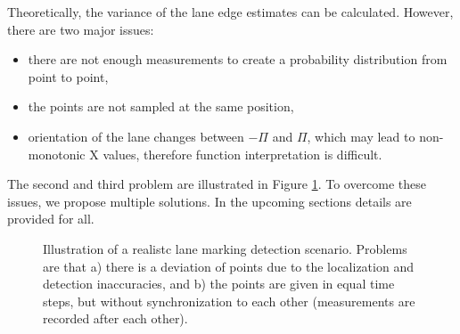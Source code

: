 \documentclass[sn-mathphys-num]{sn-jnl}%
\begin{document}
Theoretically, the variance of the lane edge estimates can be calculated. However, there are two major issues:
\begin{itemize}
    \item there are not enough measurements to create a probability distribution from point to point,
    \item the points are not sampled at the same position,
    \item orientation of the lane changes between $-\Pi$ and $\Pi$, which may lead to non-monotonic X values, therefore function interpretation is difficult.
\end{itemize}
The second and third problem are illustrated in Figure \ref{fig:deviation_problem}. To overcome these issues, we propose multiple solutions. In the upcoming 
sections details are provided for all.
\begin{figure}[h]
    \caption{Illustration of a realistc lane marking detection scenario. Problems are that a) there is a deviation of points due to the localization and 
    detection inaccuracies, and b) the points are given in equal time steps, but without synchronization to each other (measurements are recorded after 
    each other).}
    \label{fig:deviation_problem}
\end{figure}
\end{document}
